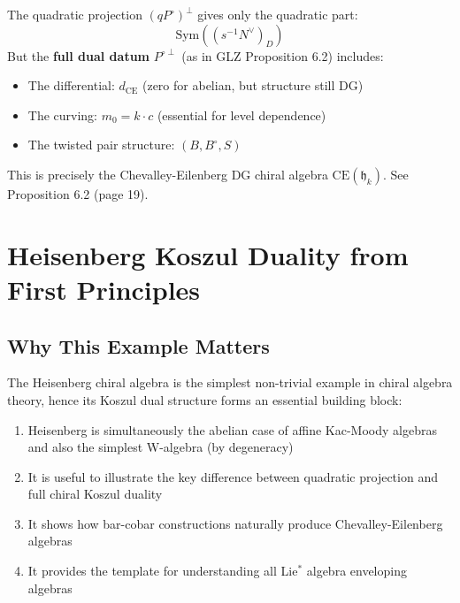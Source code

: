 \begin{remark}
The quadratic projection $(qP^\circ)^\perp$ gives only the quadratic part:
$$\text{Sym}((s^{-1}N^\vee)_D)$$
But the \textbf{full dual datum} $P^{\circ\perp}$ (as in GLZ Proposition 6.2) includes:
\begin{itemize}
\item The differential: $d_{\text{CE}}$ (zero for abelian, but structure still DG)
\item The curving: $m_0 = k \cdot c$ (essential for level dependence)
\item The twisted pair structure: $(B, B^\circ, S)$
\end{itemize}
This is precisely the Chevalley-Eilenberg DG chiral algebra $\text{CE}(\mathfrak{h}_k)$.
See \cite{GLZ-2212.11252v1} Proposition 6.2 (page 19).
\end{remark}


\section{Heisenberg Koszul Duality from First Principles}
\label{sec:heisenberg-koszul-complete}

\subsection{Why This Example Matters}

The Heisenberg chiral algebra is the simplest non-trivial example in chiral algebra theory,
hence its Koszul dual structure forms an
essential building block:
\begin{enumerate}
\item Heisenberg is simultaneously the abelian case of affine Kac-Moody algebras and also the simplest W-algebra (by degeneracy)
\item It is useful to illustrate the key difference between quadratic projection and full chiral Koszul duality
\item It shows how bar-cobar constructions naturally produce Chevalley-Eilenberg algebras
\item It provides the template for understanding all Lie$^*$ algebra enveloping algebras
\end{enumerate}

